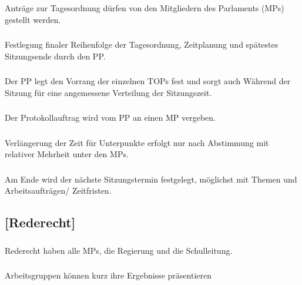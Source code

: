 \documentclass[a4paper, 11pt]{report}
\let\oldsubsection\subsection
\renewcommand{\subsection}{\leftskip=40pt\oldsubsection}
\begin{document}
\subsubsection{}
Anträge zur Tagesordnung dürfen von den Mitgliedern des Parlaments (MPs) gestellt werden.
 
\subsubsection{}
Festlegung finaler Reihenfolge der Tagesordnung, Zeitplanung und spätestes Sitzungsende durch den PP.

\subsubsection{}
Der PP legt den Vorrang der einzelnen TOPs fest und sorgt auch Während der Sitzung für eine angemessene Verteilung der Sitzungszeit.

\subsubsection{}
Der Protokollauftrag wird vom PP an einen MP vergeben.

\subsubsection{}
Verlängerung der Zeit für Unterpunkte erfolgt nur nach Abstimmung mit relativer Mehrheit unter den MPs.

\subsubsection{} 
Am Ende wird der nächste Sitzungstermin festgelegt, möglichst mit Themen und Arbeitsaufträgen/ Zeitfristen.

 

\subsection{[Rederecht]}

 
\subsubsection{}
Rederecht haben alle MPs, die Regierung und die Schulleitung.

\subsubsection{}
Arbeitsgruppen können kurz ihre Ergebnisse präsentieren 
\end{document}
